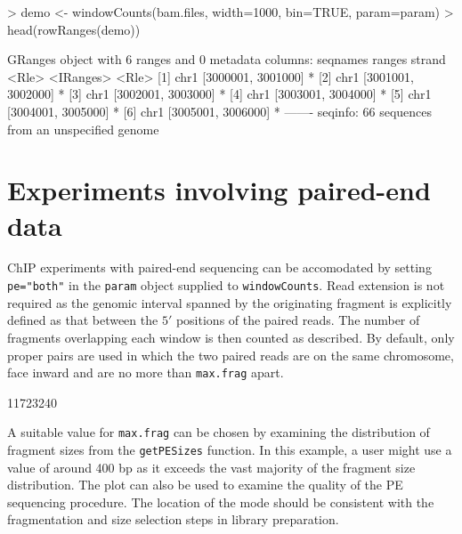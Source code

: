 \documentclass[12pt]{report}
\renewenvironment{Schunk}{\vspace{0pt}}{\vspace{0pt}}
\newcommand{\code}[1]{{\small\texttt{#1}}}
\begin{document}
\begin{Schunk}
\begin{Sinput}
> demo <- windowCounts(bam.files, width=1000, bin=TRUE, param=param)
> head(rowRanges(demo))
\end{Sinput}
\begin{Soutput}
GRanges object with 6 ranges and 0 metadata columns:
      seqnames             ranges strand
         <Rle>          <IRanges>  <Rle>
  [1]     chr1 [3000001, 3001000]      *
  [2]     chr1 [3001001, 3002000]      *
  [3]     chr1 [3002001, 3003000]      *
  [4]     chr1 [3003001, 3004000]      *
  [5]     chr1 [3004001, 3005000]      *
  [6]     chr1 [3005001, 3006000]      *
  -------
  seqinfo: 66 sequences from an unspecified genome
\end{Soutput}
\end{Schunk}

\section{Experiments involving paired-end data}
\label{data:pet}

ChIP experiments with paired-end sequencing can be accomodated by setting \code{pe="both"} in the \code{param} object supplied to \code{windowCounts}. 
Read extension is not required as the genomic interval spanned by the originating fragment is explicitly defined as that between the $5'$ positions of the paired reads.
The number of fragments overlapping each window is then counted as described. 
By default, only proper pairs are used in which the two paired reads are on the same chromosome, face inward and are no more than \code{max.frag} apart.

\begin{Schunk}
\begin{Soutput}
[1] 11723240
\end{Soutput}
\end{Schunk}

A suitable value for \code{max.frag} can be chosen by examining the distribution of fragment sizes from the \code{getPESizes} function. 
In this example, a user might use a value of around 400 bp as it exceeds the vast majority of the fragment size distribution. 
The plot can also be used to examine the quality of the PE sequencing procedure. 
The location of the mode should be consistent with the fragmentation and size selection steps in library preparation. 
\end{document}
